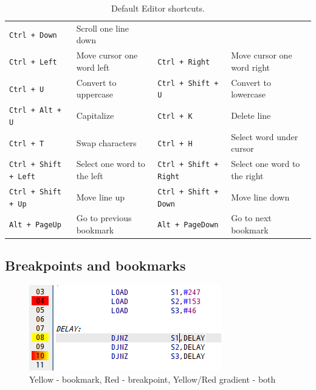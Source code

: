 \begin{table}[h!]
{\begin{tabular}{|ll|ll|}
                        \texttt{Ctrl + Down}                & Scroll one line down          \\
                        \texttt{Ctrl + Left}                & Move cursor one word left     &
                        \texttt{Ctrl + Right}               & Move cursor one word right    \\
                        \texttt{Ctrl + U}                   & Convert to uppercase          &
                        \texttt{Ctrl + Shift + U}           & Convert to lowercase          \\
                        \texttt{Ctrl + Alt + U}             & Capitalize                    &
                        \texttt{Ctrl + K}                   & Delete line                   \\
                        \texttt{Ctrl + T}                   & Swap characters               &
                        \texttt{Ctrl + H}                   & Select word under cursor      \\
                        \texttt{Ctrl + Shift + Left}        & Select one word to the left   &
                        \texttt{Ctrl + Shift + Right}       & Select one word to the right  \\
                        \texttt{Ctrl + Shift + Up}          & Move line up                  &
                        \texttt{Ctrl + Shift + Down}        & Move line down                \\
                        \texttt{Alt + PageUp}               & Go to previous bookmark       &
                        \texttt{Alt + PageDown}             & Go to next bookmark           \\
                        \hline
                \end{tabular}
            }
            \caption{Default Editor shortcuts.}
        \end{table}

    \subsection{Breakpoints and bookmarks}
         
        \begin{figure}
            \centering
                \includegraphics[width=.35\textwidth]{img/breakpoints1.png}
                \caption{Yellow - bookmark, Red - breakpoint, Yellow/Red gradient - both}
        \end{figure}

